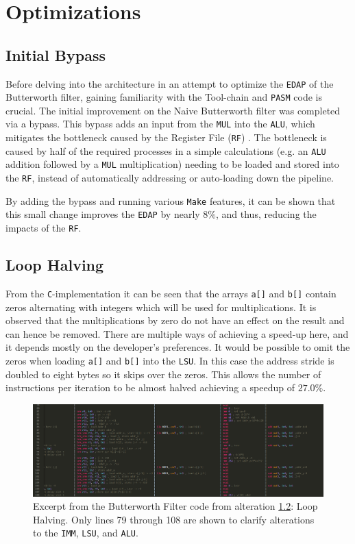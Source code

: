 \documentclass[letterpaper, 10 pt, conference]{ieeeconf}  %
\begin{document}
\section{Optimizations}

\subsection{Initial Bypass}
\label{imp:A}

Before delving into the architecture in an attempt to optimize the \texttt{EDAP} of the Butterworth filter, gaining familiarity with the Tool-chain and \texttt{PASM} code is crucial. The initial improvement on the Naive Butterworth filter was completed via a bypass. This bypass adds an input from the \texttt{MUL} into the \texttt{ALU}, which mitigates the bottleneck caused by the Register File (\texttt{RF}) . The bottleneck is caused by half of the required processes in a simple calculations (e.g. an \texttt{ALU} addition followed by a \texttt{MUL} multiplication) needing to be loaded and stored into the \texttt{RF}, instead of automatically addressing or auto-loading down the pipeline. 

By adding the bypass and running various \texttt{Make} features, it can be shown that this small change improves the \texttt{EDAP} by nearly $8\%$, and thus, reducing the impacts of the \texttt{RF}. 

\subsection{Loop Halving}
\label{imp:B}

From the \texttt{C}-implementation it can be seen that the arrays \texttt{a[]} and \texttt{b[]} contain zeros alternating with integers which will be used for multiplications. It is observed that the multiplications by zero do not have an effect on the result and can hence be removed. There are multiple ways of achieving a speed-up here, and it depends mostly on the developer's preferences. It would be possible to omit the zeros when loading \texttt{a[]} and \texttt{b[]} into the \texttt{LSU}. In this case the address stride is doubled to eight bytes so it skips over the zeros. This allows the number of instructions per iteration to be almost halved achieving a speedup of $27.0\%$.

\begin{figure}[h]
\begin{center}
\includegraphics[scale=0.265]{images/assem02.png}
\caption{Excerpt from the Butterworth Filter code from alteration \ref{imp:B}: Loop Halving. Only lines 79 through 108 are shown to clarify alterations to the \texttt{IMM}, \texttt{LSU}, and \texttt{ALU}.}
\label{fig:assem02}
\end{center}
\end{figure}
\end{document}
